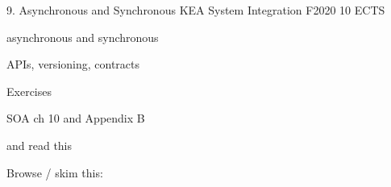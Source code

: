 \documentclass[Screen16to9,17pt]{foils}
\begin{document}
\mytitlepage
{9. Asynchronous and Synchronous}
{KEA System Integration F2020 10 ECTS}


\begin{list2}
\item asynchronous and synchronous
\item APIs, versioning, contracts
\item
\end{list2}

Exercises
\begin{list2}
\item
\item
\end{list2}




\begin{list1}
\item SOA ch 10 and Appendix B

and read this\\

\item Browse / skim this:\\

\end{list1}




\slidenext
\end{document}
